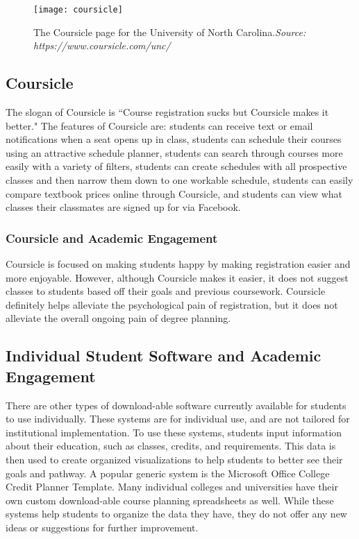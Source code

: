 \begin{figure}[h]
\centering
\texttt{[image: coursicle]}
\caption{The Coursicle page for the University of North Carolina.\textit{Source: https://www.coursicle.com/unc/}}
\end{figure}
\subsection{Coursicle}
The slogan of Coursicle is ``Course registration sucks but Coursicle makes it better." The features of Coursicle are: students can receive text or email notifications when a seat opens up in class, students can schedule their courses using an attractive schedule planner, students can search through courses more easily with a variety of filters, students can create schedules with all prospective classes and then narrow them down to one workable schedule, students can easily compare textbook prices online through Coursicle, and students can view what classes their classmates are signed up for via Facebook. 

\subsubsection{Coursicle and Academic Engagement}
Coursicle is focused on making students happy by making registration easier and more enjoyable. However, although Coursicle makes it easier, it does not suggest classes to students based off their goals and previous coursework. Coursicle definitely helps alleviate the psychological pain of registration, but it does not alleviate the overall ongoing pain of degree planning. 

\subsection{Individual Student Software and Academic Engagement}
There are other types of download-able software currently available for students to use individually. These systems are for individual use, and are not tailored for institutional implementation. To use these systems, students input information about their education, such as classes, credits, and requirements. This data is then used to create organized visualizations to help students to better see their goals and pathway. A popular generic system is the Microsoft Office College Credit Planner Template. Many individual colleges and universities have their own custom download-able course planning spreadsheets as well. While these systems help students to organize the data they have, they do not offer any new ideas or suggestions for further improvement.

